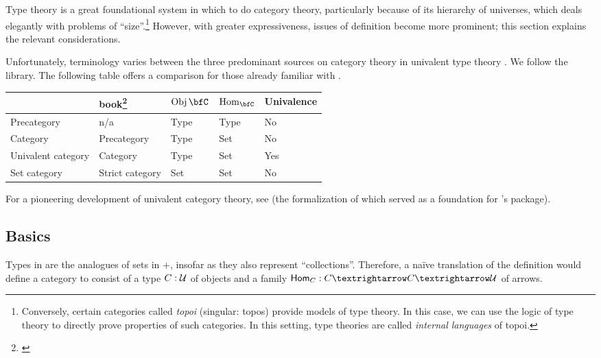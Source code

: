 \documentclass[./thesis.tex]{subfiles}
\begin{document}
Type theory is a great foundational system in which to do category theory,
particularly because of its hierarchy of universes, which deals elegantly with
problems of ``size''.\footnote{
  Conversely, certain categories called \textit{topoi} (singular: topos) provide
  models of type theory. In this case, we can use the logic of type theory to
  directly prove properties of such categories. In this setting, type theories
  are called \textit{internal languages} of topoi.} However, with greater
expressiveness,
issues of definition become more prominent; this section explains the relevant
considerations.

Unfortunately, terminology varies between the three predominant sources on
category theory in univalent type theory \cite{book} \cite{unimath}
\cite{hott-lib}. We follow the \UniMath{} library. The
following table offers a comparison for those already familiar with \cite{book}.
\begin{center}
  \begin{tabular}{| l | l | l | l | l |}
    \hline
    \UniMath{} & \HoTT{} book\footnote{\cite{book}} & $\Obj\bfC$ & $\Hom_{\bfC}$ & Univalence \\ \hline
    Precategory                  & n/a             & Type & Type  & No \\
    Category                     & Precategory     & Type & Set   & No \\
    Univalent category           & Category        & Type & Set   & Yes \\
    Set category                 & Strict category & Set  & Set   & No \\
    \hline
  \end{tabular}
\end{center}
For a pioneering development of univalent category theory, see \cite{rezk} (the
formalization of which served as a foundation for \UniMath{}'s
 package). 

\subsection{Basics}
\label{subsec:basics}

Types in \UTT{} are the analogues of sets in \ZFC{}+\FOL{}, insofar as they also
represent ``collections''. Therefore, a naïve translation of the definition
would define a category to consist of a type $C:\mathcal{U}$ of objects and a
family $\ttHom_{C}:C→C→\universe$ of arrows.
\end{document}
